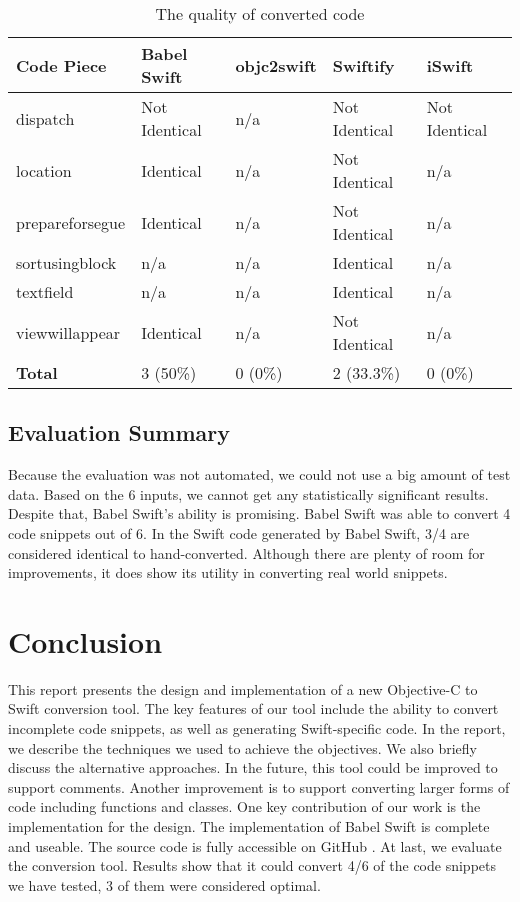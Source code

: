 \documentclass{sfuthesis}
\begin{document}
\begin{table}[H]
\begin{center}
\begin{tabular}{|l|l|l|l|l|}
\hline
\textbf{Code Piece} & Babel Swift & objc2swift & Swiftify & iSwift \\
\hline
dispatch        & Not Identical & n/a & Not Identical & Not Identical  \\
location        & Identical     & n/a & Not Identical & n/a            \\
prepareforsegue & Identical     & n/a & Not Identical & n/a            \\
sortusingblock  & n/a           & n/a & Identical     & n/a            \\
textfield       & n/a           & n/a & Identical     & n/a            \\
viewwillappear  & Identical     & n/a & Not Identical & n/a            \\
\hline
\textbf{Total}  & 3 (50\%) & 0 (0\%) & 2 (33.3\%) & 0 (0\%) \\
\hline
\end{tabular}
\end{center}
\caption{The quality of converted code}
\label{table:quality}
\end{table}

\section{Evaluation Summary}

Because the evaluation was not automated, we could not use a big amount of test data. Based on the 6 inputs, we cannot get any statistically significant results. Despite that, Babel Swift's ability is promising. Babel Swift was able to convert 4 code snippets out of 6. In the Swift code generated by Babel Swift, 3/4 are considered identical to hand-converted. Although there are plenty of room for improvements, it does show its utility in converting real world snippets.

\chapter{Conclusion}

This report presents the design and implementation of a new Objective-C to Swift conversion tool. The key features of our tool include the ability to convert incomplete code snippets, as well as generating Swift-specific code. In the report, we describe the techniques we used to achieve the objectives. We also briefly discuss the alternative approaches. In the future, this tool could be improved to support comments. Another improvement is to support converting larger forms of code including functions and classes.
One key contribution of our work is the implementation for the design. The implementation of Babel Swift is complete and useable. The source code is fully accessible on GitHub \cite{babelswift}. At last, we evaluate the conversion tool. Results show that it could convert 4/6 of the code snippets we have tested, 3 of them were considered optimal.
\end{document}
